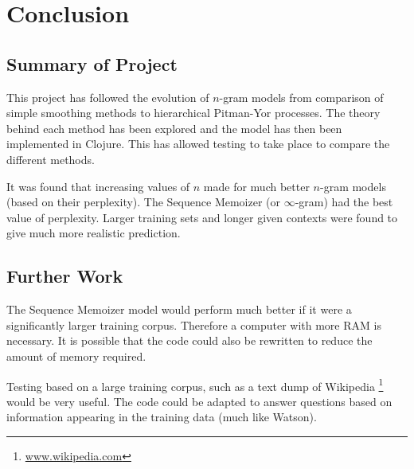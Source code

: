 \chapter{Conclusion}

\section{Summary of Project}

This project has followed the evolution of $n$-gram models from comparison of simple smoothing methods to hierarchical Pitman-Yor processes. The theory behind each method has been explored and the model has then been implemented in Clojure. This has allowed testing to take place to compare the different methods.

It was found that increasing values of $n$ made for much better $n$-gram models (based on their perplexity). The Sequence Memoizer (or $\infty$-gram) had the best value of perplexity. Larger training sets and longer given contexts were found to give much more realistic prediction.

\section{Further Work}

The Sequence Memoizer model would perform much better if it were a significantly larger training corpus. Therefore a computer with more RAM is necessary. It is possible that the code could also be rewritten to reduce the amount of memory required. 

Testing based on a large training corpus, such as a text dump of Wikipedia \footnote{\url{www.wikipedia.com}} would be very useful. The code could be adapted to answer questions based on information appearing in the training data (much like Watson).